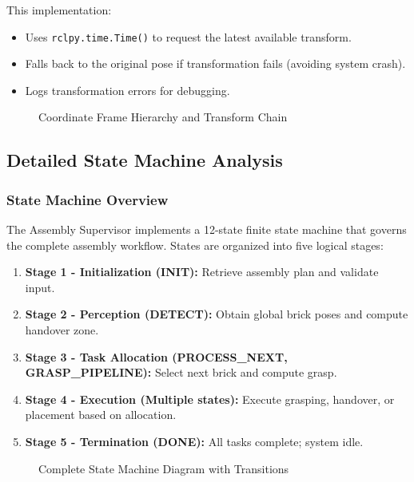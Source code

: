 This implementation:
\begin{itemize}
    \item Uses \texttt{rclpy.time.Time()} to request the latest available transform.
    \item Falls back to the original pose if transformation fails (avoiding system crash).
    \item Logs transformation errors for debugging.
\end{itemize}

\begin{figure}[H]
    \centering
    \caption{Coordinate Frame Hierarchy and Transform Chain}
    \label{fig:tf_hierarchy}
\end{figure}

\subsection{Detailed State Machine Analysis}

\subsubsection{State Machine Overview}

The Assembly Supervisor implements a 12-state finite state machine that governs the complete assembly workflow. States are organized into five logical stages:

\begin{enumerate}
    \item \textbf{Stage 1 - Initialization (INIT):} Retrieve assembly plan and validate input.
    \item \textbf{Stage 2 - Perception (DETECT):} Obtain global brick poses and compute handover zone.
    \item \textbf{Stage 3 - Task Allocation (PROCESS\_NEXT, GRASP\_PIPELINE):} Select next brick and compute grasp.
    \item \textbf{Stage 4 - Execution (Multiple states):} Execute grasping, handover, or placement based on allocation.
    \item \textbf{Stage 5 - Termination (DONE):} All tasks complete; system idle.
\end{enumerate}

\begin{figure}[H]
    \centering
    \caption{Complete State Machine Diagram with Transitions}
    \label{fig:state_machine_diagram}
\end{figure}

